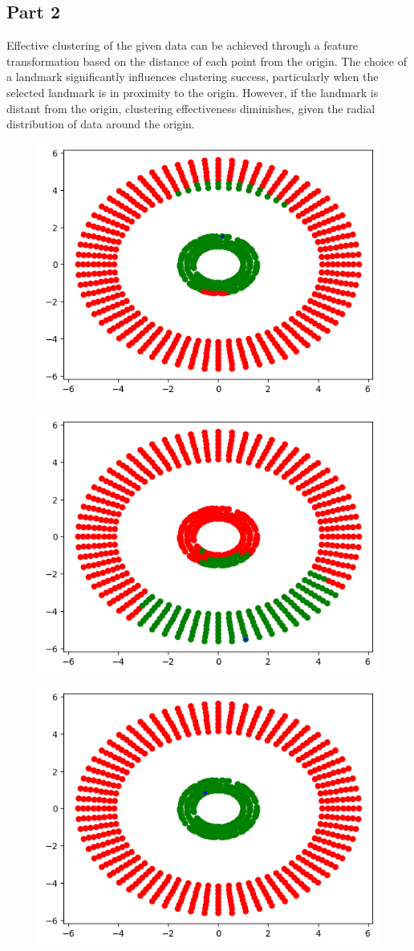 \documentclass[a4paper,11pt]{article}
\begin{document}
\begin{mlsolution}
\subsection{Part 2}
Effective clustering of the given data can be achieved through a feature transformation based on the distance of each point from the origin. The choice of a landmark significantly influences clustering success, particularly when the selected landmark is in proximity to the origin. However, if the landmark is distant from the origin, clustering effectiveness diminishes, given the radial distribution of data around the origin.
\begin{figure}[H]
	\centering
	\includegraphics[width=0.5\linewidth]{5.2.2.1.png}
	\label{fig:5.2.2.1}
\end{figure}
\begin{figure}[H]
	\centering
	\includegraphics[width=0.5\linewidth]{5.2.2.2.png}
	\label{fig:5.2.2.2}
\end{figure}
\begin{figure}[H]
	\centering
	\includegraphics[width=0.5\linewidth]{5.2.2.3.png}

\end{figure}
\end{mlsolution}
\end{document}
